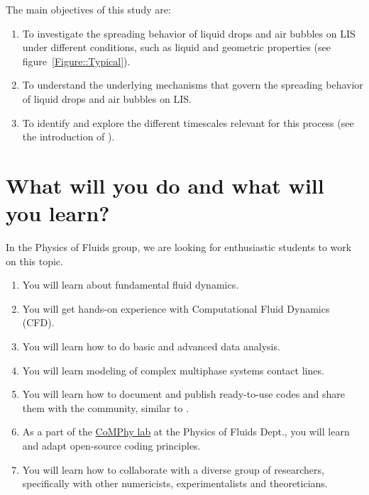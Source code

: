 \documentclass[a4paper,10pt]{article}
\begin{document}
\noindent The main objectives of this study are:

\begin{enumerate}
	\item To investigate the spreading behavior of liquid drops and air bubbles on LIS under different conditions, such as liquid and geometric properties (see figure~\ref{Figure::Typical}). 
	\item To understand the underlying mechanisms that govern the spreading behavior of liquid drops and air bubbles on LIS. 
	\item To identify and explore the different timescales relevant for this process (see the introduction of \citet{VatsalThesis}).
\end{enumerate}

\section*{What will you do and what will you learn?}
In the Physics of Fluids group, we are looking for enthusiastic students to work on this topic.
\begin{enumerate}
\itemsep0em
\item You will learn about fundamental fluid dynamics.
\item You will get hands-on experience with Computational Fluid Dynamics (CFD).
\item You will learn how to do basic and advanced data analysis.
\item You will learn modeling of complex multiphase systems contact lines. 
\item You will learn how to document and publish ready-to-use codes and share them with the community, similar to \citet{basiliskVatsal, basiliskVatsalDropFilm, basiliskVatsalViscousBouncing}. 
\item As a part of the \href{https://comphy-lab.org}{CoMPhy lab} at the Physics of Fluids Dept., you will learn and adapt open-source coding principles. 
\item You will learn how to collaborate with a diverse group of researchers, specifically with other numericists, experimentalists and theoreticians.
\end{enumerate}
\end{document}
